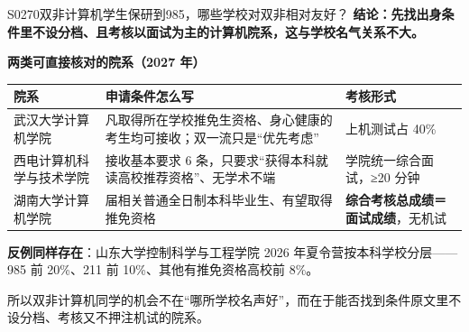 \begin{qa}{S0270}{双非计算机学生保研到985，哪些学校对双非相对友好？}
\textbf{结论：先找出身条件里不设分档、且考核以面试为主的计算机院系，这与学校名气关系不大。}

\textbf{两类可直接核对的院系（2027 年）}

\par\vspace{2pt}\nobreak\begin{center}\footnotesize
\begin{tabularx}{\textwidth}{>{\raggedright\arraybackslash}X>{\raggedright\arraybackslash}X>{\raggedright\arraybackslash}X}
\toprule
\textbf{院系} & \textbf{申请条件怎么写} & \textbf{考核形式} \\ \midrule
武汉大学计算机学院 & 凡取得所在学校推免生资格、身心健康的考生均可接收；双一流只是“优先考虑” & 上机测试占 40\% \\
西电计算机科学与技术学院 & 接收基本要求 6 条，只要求“获得本科就读高校推荐资格”、无学术不端 & 学院统一综合面试，≥20 分钟 \\
湖南大学计算机学院 & 2027 届相关普通全日制本科毕业生、有望取得推免资格 & \textbf{综合考核总成绩＝面试成绩}，无机试 \\
\bottomrule
\end{tabularx}
\end{center}\vspace{2pt}\par

\textbf{反例同样存在}：山东大学控制科学与工程学院 2026 年夏令营按本科学校分层——985 前 20\%、211 前 10\%、其他有推免资格高校前 8\%。

所以双非计算机同学的机会不在“哪所学校名声好”，而在于能否找到条件原文里不设分档、考核又不押注机试的院系。
\end{qa}

